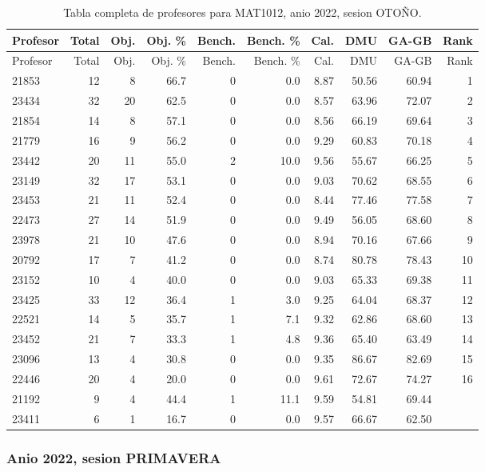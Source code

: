 \begingroup
\scriptsize
\setlength{\tabcolsep}{3pt}
\begin{longtable}{lrrrrrrrrr}
\caption{Tabla completa de profesores para MAT1012, anio 2022, sesion OTOÑO.}\label{tab:prof-period-mat1012-2022-oto-o-especializado}\\
\toprule
Profesor & Total & Obj. & Obj. \% & Bench. & Bench. \% & Cal. & DMU & GA-GB & Rank \\
\midrule
\endfirsthead
\toprule
Profesor & Total & Obj. & Obj. \% & Bench. & Bench. \% & Cal. & DMU & GA-GB & Rank \\
\midrule
\endhead
21853 & 12 & 8 & 66.7 & 0 & 0.0 & 8.87 & 50.56 & 60.94 & 1 \\
23434 & 32 & 20 & 62.5 & 0 & 0.0 & 8.57 & 63.96 & 72.07 & 2 \\
21854 & 14 & 8 & 57.1 & 0 & 0.0 & 8.56 & 66.19 & 69.64 & 3 \\
21779 & 16 & 9 & 56.2 & 0 & 0.0 & 9.29 & 60.83 & 70.18 & 4 \\
23442 & 20 & 11 & 55.0 & 2 & 10.0 & 9.56 & 55.67 & 66.25 & 5 \\
23149 & 32 & 17 & 53.1 & 0 & 0.0 & 9.03 & 70.62 & 68.55 & 6 \\
23453 & 21 & 11 & 52.4 & 0 & 0.0 & 8.44 & 77.46 & 77.58 & 7 \\
22473 & 27 & 14 & 51.9 & 0 & 0.0 & 9.49 & 56.05 & 68.60 & 8 \\
23978 & 21 & 10 & 47.6 & 0 & 0.0 & 8.94 & 70.16 & 67.66 & 9 \\
20792 & 17 & 7 & 41.2 & 0 & 0.0 & 8.74 & 80.78 & 78.43 & 10 \\
23152 & 10 & 4 & 40.0 & 0 & 0.0 & 9.03 & 65.33 & 69.38 & 11 \\
23425 & 33 & 12 & 36.4 & 1 & 3.0 & 9.25 & 64.04 & 68.37 & 12 \\
22521 & 14 & 5 & 35.7 & 1 & 7.1 & 9.32 & 62.86 & 68.60 & 13 \\
23452 & 21 & 7 & 33.3 & 1 & 4.8 & 9.36 & 65.40 & 63.49 & 14 \\
23096 & 13 & 4 & 30.8 & 0 & 0.0 & 9.35 & 86.67 & 82.69 & 15 \\
22446 & 20 & 4 & 20.0 & 0 & 0.0 & 9.61 & 72.67 & 74.27 & 16 \\
21192 & 9 & 4 & 44.4 & 1 & 11.1 & 9.59 & 54.81 & 69.44 &  \\
23411 & 6 & 1 & 16.7 & 0 & 0.0 & 9.57 & 66.67 & 62.50 &  \\
\bottomrule
\end{longtable}
\endgroup

\subsubsection{Anio 2022, sesion PRIMAVERA}


